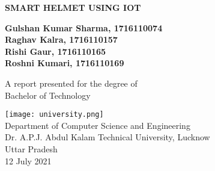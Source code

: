 \begin{titlepage}
	\begin{center}
		\vspace*{1cm}
		
		\textbf{\Huge{SMART HELMET USING IOT}}
		
		\vspace{0.5cm}
		
		
		\vspace{1.5cm}
		
		\textbf{Gulshan Kumar Sharma, 1716110074\\Raghav Kalra, 1716110157\\Rishi Gaur, 1716110165 \\ Roshni Kumari, 1716110169}
		
		\vspace{1cm}
		
		A report presented for the degree of\\
		Bachelor of Technology
		
		\vspace{1.8cm}
		
		\texttt{[image: university.png]}
		\vspace{1.5cm}
		\\Department of Computer Science and 
		Engineering\\
		\vspace{0.5cm}
		Dr. A.P.J. Abdul Kalam Technical University, Lucknow\\
		Uttar Pradesh\\
		12 July 2021		
	\end{center}
\end{titlepage}